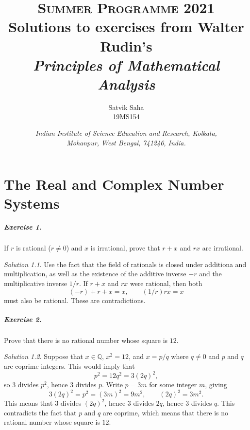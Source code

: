 \documentclass[11pt]{report}
\title{
    \Large\textsc{Summer Programme 2021} \\
    \vspace{10pt}
    \huge Solutions to exercises from Walter Rudin's \\
    \textit{Principles of Mathematical Analysis} 
}
\author{
    \large Satvik Saha%
    \\\textsc{\small 19MS154}
}
\date{\normalsize
    \textit{Indian Institute of Science Education and Research, Kolkata, \\
    Mohanpur, West Bengal, 741246, India.} \\
}
\def\Q{\mathbb{Q}}
\theoremstyle{remark}
\newtheorem*{solution}{Solution}
\begin{document}
    \maketitle
    \tableofcontents


    \chapter{The Real and Complex Number Systems}

    \paragraph{Exercise 1.} If $r$ is rational ($r \neq 0$) and $x$ is irrational,
    prove that $r + x$ and $rx$ are irrational.
    \begin{solution}
        Use the fact that the field of rationals is closed under additiona and
        multiplication, as well as the existence of the additive inverse $-r$ and
        the multiplicative inverse $1 / r$. If $r + x$ and $rx$ were rational, then
        both \[
            (-r) + r + x = x, \qquad (1 / r) rx = x
        \] must also be rational. These are contradictions.
    \end{solution}

    \paragraph{Exercise 2.} Prove that there is no rational number whose square is
    $12$.
    \begin{solution}
        Suppose that $x \in \Q$, $x^2 = 12$, and $x = p / q$ where $q \neq 0$ and
        $p$ and $q$ are coprime integers. This would imply that \[
            p^2 = 12q^2 = 3(2q)^2,
        \] so $3$ divides $p^2$, hence $3$ divides $p$. Write $p = 3m$ for some
        integer $m$, giving \[
            3(2q)^2 = p^2 = (3m)^2 = 9m^2, \qquad (2q)^2 = 3m^2.
        \] This means that $3$ divides $(2q)^2$, hence $3$ divides $2q$, hence $3$
        divides $q$. This contradicts the fact that $p$ and $q$ are coprime, which
        means that there is no rational number whose square is $12$.
    \end{solution}
\end{document}
